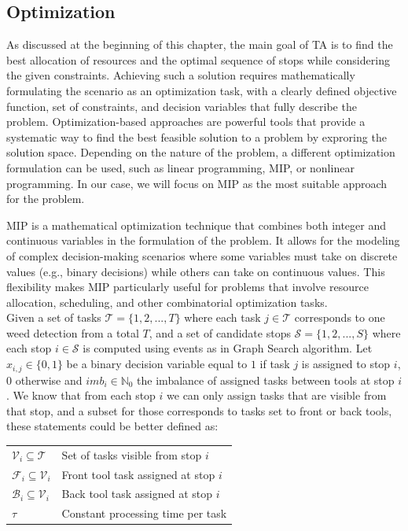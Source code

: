 \subsection{Optimization}
As discussed at the beginning of this chapter, the main goal of \ac{TA} is to find the best allocation of resources and the optimal sequence of stops while considering the given constraints. Achieving such a solution requires mathematically formulating the scenario as an optimization task, with a clearly defined objective function, set of constraints, and decision variables that fully describe the problem. Optimization-based approaches are powerful tools that provide a systematic way to find the best feasible solution to a problem by exproring the solution space. Depending on the nature of the problem, a different optimization formulation can be used, such as linear programming, \ac{MIP}, or nonlinear programming. In our case, we will focus on \ac{MIP} as the most suitable approach for the problem.

\ac{MIP} is a mathematical optimization technique that combines both integer and continuous variables in the formulation of the problem. It allows for the modeling of complex decision-making scenarios where some variables must take on discrete values (e.g., binary decisions) while others can take on continuous values. This flexibility makes \ac{MIP} particularly useful for problems that involve resource allocation, scheduling, and other combinatorial optimization tasks. \\

Given a set of tasks $\mathcal{T} = \{1,2,...,T\}$ where each task $j \in \mathcal{T}$ corresponds to one weed detection from a total $T$, and a set of candidate stops $\mathcal{S} = \{1,2,...,S\}$ where each stop $i \in \mathcal{S}$ is computed using events as in Graph Search algorithm. Let $x_{i,j} \in \{0,1\} $ be a binary decision variable equal to $1$ if task $j$ is assigned to stop $i$, $0$ otherwise and ${imb}_i \in \mathbb{N}_0$ the imbalance of assigned tasks between tools at stop $i$. We know that from each stop $i$ we can only assign tasks that are visible from that stop, and a subset for those corresponds to tasks set to front or back tools, these statements could be better defined as:

\begin{tabular}{ll}
    $\mathcal{V}_i \subseteq \mathcal{T}$   & Set of tasks visible from stop $i$   \\
    $\mathcal{F}_i \subseteq \mathcal{V}_i$ & Front tool task assigned at stop $i$ \\
    $\mathcal{B}_i \subseteq \mathcal{V}_i$ & Back tool task assigned at stop $i$  \\
    $\tau$                                  & Constant processing time per task    \\
\end{tabular}

